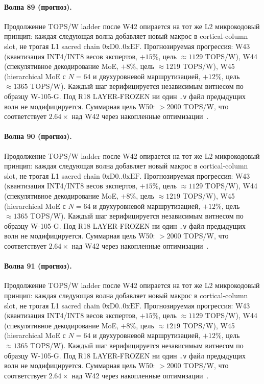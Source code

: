 \paragraph{Волна 89 (прогноз).} Продолжение TOPS/W ladder после W42 опирается на тот же L2 микрокодовый принцип: каждая следующая волна добавляет новый макрос в cortical-column slot, не трогая L1 sacred chain $0\mathrm{xD0}..0\mathrm{xEF}$. Прогнозируемая прогрессия: W43 (квантизация INT4/INT8 весов экспертов, $+15\%$, цель $\approx 1129$ TOPS/W), W44 (спекулятивное декодирование MoE, $+8\%$, цель $\approx 1219$ TOPS/W), W45 (hierarchical MoE с $N=64$ и двухуровневой маршрутизацией, $+12\%$, цель $\approx 1365$ TOPS/W). Каждый шаг верифицируется независимым витнесом по образцу W-105-G. Под R18 LAYER-FROZEN ни один \texttt{.v} файл предыдущих волн не модифицируется. Суммарная цель W50: $> 2000$ TOPS/W, что соответствует $2{.}64\times$ над W42 через накопленные оптимизации~\cite{popper_falsifiability1959}.

\paragraph{Волна 90 (прогноз).} Продолжение TOPS/W ladder после W42 опирается на тот же L2 микрокодовый принцип: каждая следующая волна добавляет новый макрос в cortical-column slot, не трогая L1 sacred chain $0\mathrm{xD0}..0\mathrm{xEF}$. Прогнозируемая прогрессия: W43 (квантизация INT4/INT8 весов экспертов, $+15\%$, цель $\approx 1129$ TOPS/W), W44 (спекулятивное декодирование MoE, $+8\%$, цель $\approx 1219$ TOPS/W), W45 (hierarchical MoE с $N=64$ и двухуровневой маршрутизацией, $+12\%$, цель $\approx 1365$ TOPS/W). Каждый шаг верифицируется независимым витнесом по образцу W-105-G. Под R18 LAYER-FROZEN ни один \texttt{.v} файл предыдущих волн не модифицируется. Суммарная цель W50: $> 2000$ TOPS/W, что соответствует $2{.}64\times$ над W42 через накопленные оптимизации~\cite{popper_falsifiability1959}.

\paragraph{Волна 91 (прогноз).} Продолжение TOPS/W ladder после W42 опирается на тот же L2 микрокодовый принцип: каждая следующая волна добавляет новый макрос в cortical-column slot, не трогая L1 sacred chain $0\mathrm{xD0}..0\mathrm{xEF}$. Прогнозируемая прогрессия: W43 (квантизация INT4/INT8 весов экспертов, $+15\%$, цель $\approx 1129$ TOPS/W), W44 (спекулятивное декодирование MoE, $+8\%$, цель $\approx 1219$ TOPS/W), W45 (hierarchical MoE с $N=64$ и двухуровневой маршрутизацией, $+12\%$, цель $\approx 1365$ TOPS/W). Каждый шаг верифицируется независимым витнесом по образцу W-105-G. Под R18 LAYER-FROZEN ни один \texttt{.v} файл предыдущих волн не модифицируется. Суммарная цель W50: $> 2000$ TOPS/W, что соответствует $2{.}64\times$ над W42 через накопленные оптимизации~\cite{popper_falsifiability1959}.

